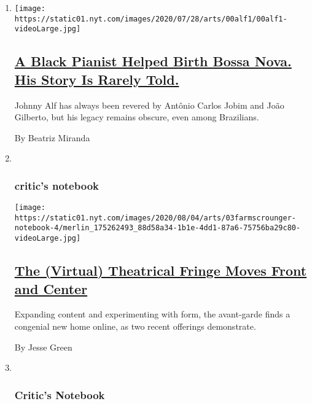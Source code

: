 \begin{enumerate}
\def\labelenumi{\arabic{enumi}.}
\item
  \texttt{[image: https://static01.nyt.com/images/2020/07/28/arts/00alf1/00alf1-videoLarge.jpg]}

  \hypertarget{a-black-pianist-helped-birth-bossa-nova-his-story-is-rarely-told}{%
  \subsection{\texorpdfstring{\href{/2020/08/04/arts/music/johnny-alf-bossa-nova.html}{A
  Black Pianist Helped Birth Bossa Nova. His Story Is Rarely
  Told.}}{A Black Pianist Helped Birth Bossa Nova. His Story Is Rarely Told.}}\label{a-black-pianist-helped-birth-bossa-nova-his-story-is-rarely-told}}

  Johnny Alf has always been revered by Antônio Carlos Jobim and João
  Gilberto, but his legacy remains obscure, even among Brazilians.

  By Beatriz Miranda
\item ~
  \hypertarget{critics-notebook}{%
  \subsubsection{critic's notebook}\label{critics-notebook}}

  \texttt{[image: https://static01.nyt.com/images/2020/08/04/arts/03farmscrounger-notebook-4/merlin\_175262493\_88d58a34-1b1e-4dd1-87a6-75756ba29c80-videoLarge.jpg]}

  \hypertarget{the-virtual-theatrical-fringe-moves-front-and-center}{%
  \subsection{\texorpdfstring{\href{/2020/08/03/theater/virtual-theater.html}{The
  (Virtual) Theatrical Fringe Moves Front and
  Center}}{The (Virtual) Theatrical Fringe Moves Front and Center}}\label{the-virtual-theatrical-fringe-moves-front-and-center}}

  Expanding content and experimenting with form, the avant-garde finds a
  congenial new home online, as two recent offerings demonstrate.

  By Jesse Green
\item ~
  \hypertarget{critics-notebook-1}{%
  \subsubsection{Critic's Notebook}\label{critics-notebook-1}}


\end{enumerate}
